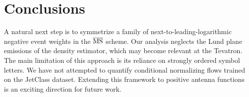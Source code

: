 \section{Conclusions}\label{sec:conclusions}

A natural next step is to symmetrize a family of
next-to-leading-logarithmic negative event weights in the $\overline{\rm
MS}$ scheme. Our analysis neglects the Lund plane emissions of the
density estimator, which may become relevant at the Tevatron. The main
limitation of this approach is its reliance on strongly ordered symbol
letters. We have not attempted to quantify conditional normalizing flows
trained on the JetClass dataset. Extending this framework to positive
antenna functions is an exciting direction for future work.

